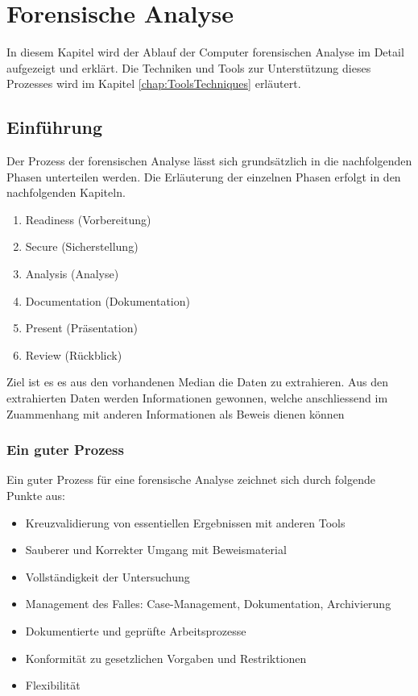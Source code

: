 \chapter{Forensische Analyse} \label{chap:ForensischeAnalyse}
In diesem Kapitel wird der Ablauf der Computer forensischen Analyse im Detail aufgezeigt und erklärt. Die Techniken und Tools zur Unterstützung dieses Prozesses wird im Kapitel \ref{chap:ToolsTechniques}  erläutert.


\section{Einführung}
Der Prozess der forensischen Analyse lässt sich grundsätzlich in die nachfolgenden Phasen unterteilen werden. Die Erläuterung der einzelnen Phasen erfolgt in den nachfolgenden Kapiteln.

\begin{enumerate}
\item Readiness (Vorbereitung)
\item Secure (Sicherstellung)
\item Analysis (Analyse)
\item Documentation (Dokumentation)
\item Present (Präsentation)
\item Review (Rückblick)
\end{enumerate}

Ziel ist es es aus den vorhandenen Median die Daten zu extrahieren. Aus den extrahierten Daten werden Informationen gewonnen, welche anschliessend im Zuammenhang mit anderen Informationen als Beweis dienen können


\subsection{Ein guter Prozess}
Ein guter Prozess für eine forensische Analyse zeichnet sich durch folgende Punkte aus:

\begin{itemize}
\item Kreuzvalidierung von essentiellen Ergebnissen mit anderen Tools
\item Sauberer und Korrekter Umgang mit Beweismaterial
\item Vollständigkeit der Untersuchung
\item Management des Falles: Case-Management, Dokumentation, Archivierung
\item Dokumentierte und geprüfte Arbeitsprozesse
\item Konformität zu gesetzlichen Vorgaben und Restriktionen
\item Flexibilität
\end{itemize}

